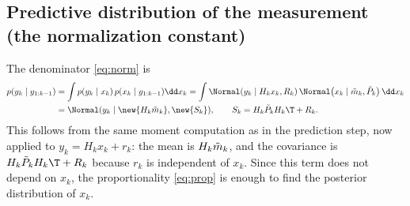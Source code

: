 \subsection{Predictive distribution of the measurement (the normalization constant)}
The denominator \eqref{eq:norm} is
\begin{equation}
  \begin{aligned}
  p(y_k \mid y_{1:k-1}) &= \int p(y_k \mid x_k)\, p(x_k \mid y_{1:k-1}) \dd x_k = \int \Normal(y_k \mid H_k x_k, R_k)\, \Normal\!\left(x_k \mid \mt_k, \Pt_k\right) \dd x_k \\
  &= \Normal(y_k \mid \new{H_k\mt_k}, \new{S_k}), \qquad S_k = H_k\Pt_k H_k\T + R_k.
  \end{aligned}\label{eq:S}
\end{equation}
This follows from the same moment computation as in the prediction step, now applied to $y_k = H_k x_k + r_k$: the mean is $H_k\tilde m_k$, and the covariance is $H_k\Pt_k H_k\T + R_k$ because $r_k$ is independent of $x_k$. Since this term does not depend on $x_k$, the proportionality \eqref{eq:prop} is enough to find the posterior distribution of $x_k$.

